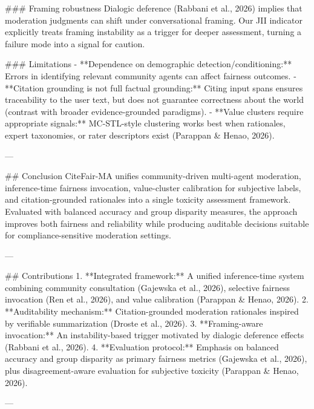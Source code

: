 ### Framing robustness  
Dialogic deference (Rabbani et al., 2026) implies that moderation judgments can shift under conversational framing. Our JII indicator explicitly treats framing instability as a trigger for deeper assessment, turning a failure mode into a signal for caution.

### Limitations  
- **Dependence on demographic detection/conditioning:** Errors in identifying relevant community agents can affect fairness outcomes.  
- **Citation grounding is not full factual grounding:** Citing input spans ensures traceability to the user text, but does not guarantee correctness about the world (contrast with broader evidence-grounded paradigms).  
- **Value clusters require appropriate signals:** MC-STL-style clustering works best when rationales, expert taxonomies, or rater descriptors exist (Parappan & Henao, 2026).

---

## Conclusion  
CiteFair-MA unifies community-driven multi-agent moderation, inference-time fairness invocation, value-cluster calibration for subjective labels, and citation-grounded rationales into a single toxicity assessment framework. Evaluated with balanced accuracy and group disparity measures, the approach improves both fairness and reliability while producing auditable decisions suitable for compliance-sensitive moderation settings.

---

## Contributions  
1. **Integrated framework:** A unified inference-time system combining community consultation (Gajewska et al., 2026), selective fairness invocation (Ren et al., 2026), and value calibration (Parappan & Henao, 2026).  
2. **Auditability mechanism:** Citation-grounded moderation rationales inspired by verifiable summarization (Droste et al., 2026).  
3. **Framing-aware invocation:** An instability-based trigger motivated by dialogic deference effects (Rabbani et al., 2026).  
4. **Evaluation protocol:** Emphasis on balanced accuracy and group disparity as primary fairness metrics (Gajewska et al., 2026), plus disagreement-aware evaluation for subjective toxicity (Parappan & Henao, 2026).

---